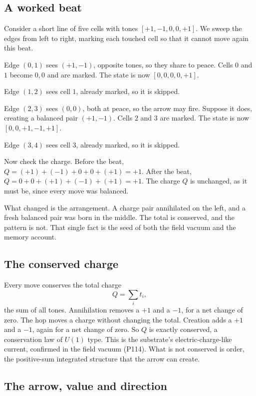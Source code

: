 \subsection{A worked beat}

Consider a short line of five cells with tones $[+1, -1, 0, 0, +1]$. We sweep the edges from left to right, marking each touched cell so that it cannot move again this beat.

Edge $(0,1)$ sees $(+1, -1)$, opposite tones, so they share to peace. Cells $0$ and $1$ become $0, 0$ and are marked. The state is now $[0, 0, 0, 0, +1]$.

Edge $(1,2)$ sees cell $1$, already marked, so it is skipped.

Edge $(2,3)$ sees $(0, 0)$, both at peace, so the arrow may fire. Suppose it does, creating a balanced pair $(+1, -1)$. Cells $2$ and $3$ are marked. The state is now $[0, 0, +1, -1, +1]$.

Edge $(3,4)$ sees cell $3$, already marked, so it is skipped.

Now check the charge. Before the beat, $Q = (+1) + (-1) + 0 + 0 + (+1) = +1$. After the beat, $Q = 0 + 0 + (+1) + (-1) + (+1) = +1$. The charge $Q$ is unchanged, as it must be, since every move was balanced.

What changed is the arrangement. A charge pair annihilated on the left, and a fresh balanced pair was born in the middle. The total is conserved, and the pattern is not. That single fact is the seed of both the field vacuum and the memory account.

\subsection{The conserved charge}

Every move conserves the total charge
\[
Q = \sum_i t_i,
\]
the sum of all tones. Annihilation removes a $+1$ and a $-1$, for a net change of zero. The hop moves a charge without changing the total. Creation adds a $+1$ and a $-1$, again for a net change of zero. So $Q$ is exactly conserved, a conservation law of $U(1)$ type. This is the substrate's electric-charge-like current, confirmed in the field vacuum (P114). What is not conserved is order, the positive-sum integrated structure that the arrow can create.

\subsection{The arrow, value and direction}

